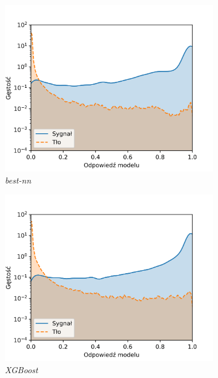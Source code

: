 \documentclass{pracalicmgr}
\begin{document}
\begin{figure}[H]
\begin{subfigure}{.5\textwidth}
	\includegraphics[width=1\textwidth]{density_best-nn.png}
	\caption{\textit{best-nn}}
	\end{subfigure}
	\begin{subfigure}{.5\textwidth}
	\centering
	\includegraphics[width=1\textwidth]{density_XGBoost.png}
	\caption{\textit{XGBoost}}
	\end{subfigure}
	\begin{subfigure}{.5\textwidth}
	\centering

\end{subfigure}
\end{figure}
\end{document}

